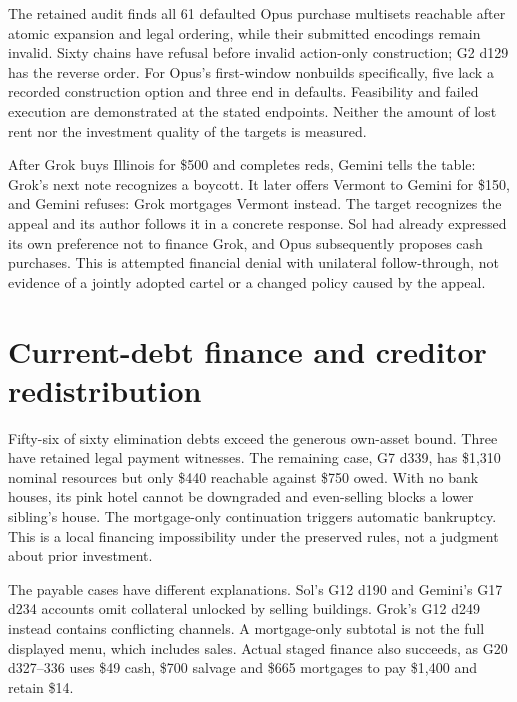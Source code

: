 The retained audit finds all 61 defaulted Opus purchase multisets reachable after atomic expansion and legal ordering, while their submitted encodings remain invalid. Sixty chains have refusal before invalid action-only construction; G2 d129 has the reverse order. For Opus's first-window nonbuilds specifically, five lack a recorded construction option and three end in defaults. Feasibility and failed execution are demonstrated at the stated endpoints. Neither the amount of lost rent nor the investment quality of the targets is measured.


After Grok buys Illinois for \$500 and completes reds, Gemini tells the table:
Grok's next note recognizes a boycott. It later offers Vermont to Gemini for \$150, and Gemini refuses:
Grok mortgages Vermont instead. The target recognizes the appeal and its author follows it in a concrete response. Sol had already expressed its own preference not to finance Grok, and Opus subsequently proposes cash purchases. This is attempted financial denial with unilateral follow-through, not evidence of a jointly adopted cartel or a changed policy caused by the appeal.

\section{Current-debt finance and creditor redistribution}

Fifty-six of sixty elimination debts exceed the generous own-asset bound. Three have retained legal payment witnesses. The remaining case, G7 d339, has \$1,310 nominal resources but only \$440 reachable against \$750 owed. With no bank houses, its pink hotel cannot be downgraded and even-selling blocks a lower sibling's house. The mortgage-only continuation triggers automatic bankruptcy. This is a local financing impossibility under the preserved rules, not a judgment about prior investment.

The payable cases have different explanations. Sol's G12 d190 and Gemini's G17 d234 accounts omit collateral unlocked by selling buildings. Grok's G12 d249 instead contains conflicting channels. A mortgage-only subtotal is not the full displayed menu, which includes sales. Actual staged finance also succeeds, as G20 d327--336 uses \$49 cash, \$700 salvage and \$665 mortgages to pay \$1,400 and retain \$14.

